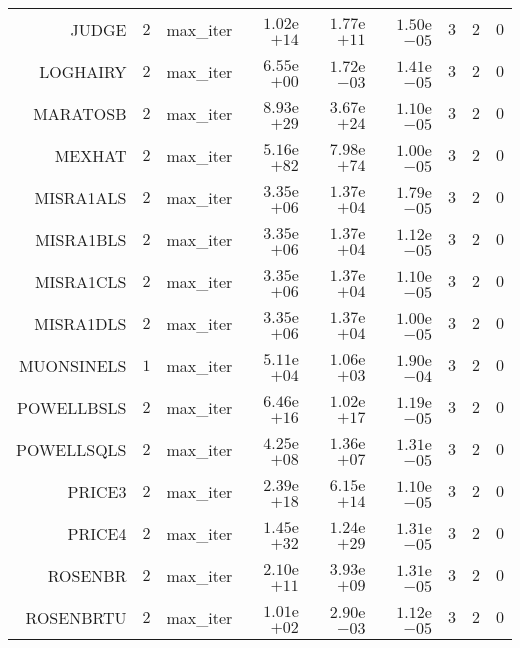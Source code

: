 \begin{longtable}{rrrrrrrrr}
JUDGE & \(     2\) & max\_iter & \( 1.02\)e\(+14\) & \( 1.77\)e\(+11\) & \( 1.50\)e\(-05\) & \(     3\) & \(     2\) & \(     0\) \\
LOGHAIRY & \(     2\) & max\_iter & \( 6.55\)e\(+00\) & \( 1.72\)e\(-03\) & \( 1.41\)e\(-05\) & \(     3\) & \(     2\) & \(     0\) \\
MARATOSB & \(     2\) & max\_iter & \( 8.93\)e\(+29\) & \( 3.67\)e\(+24\) & \( 1.10\)e\(-05\) & \(     3\) & \(     2\) & \(     0\) \\
MEXHAT & \(     2\) & max\_iter & \( 5.16\)e\(+82\) & \( 7.98\)e\(+74\) & \( 1.00\)e\(-05\) & \(     3\) & \(     2\) & \(     0\) \\
MISRA1ALS & \(     2\) & max\_iter & \( 3.35\)e\(+06\) & \( 1.37\)e\(+04\) & \( 1.79\)e\(-05\) & \(     3\) & \(     2\) & \(     0\) \\
MISRA1BLS & \(     2\) & max\_iter & \( 3.35\)e\(+06\) & \( 1.37\)e\(+04\) & \( 1.12\)e\(-05\) & \(     3\) & \(     2\) & \(     0\) \\
MISRA1CLS & \(     2\) & max\_iter & \( 3.35\)e\(+06\) & \( 1.37\)e\(+04\) & \( 1.10\)e\(-05\) & \(     3\) & \(     2\) & \(     0\) \\
MISRA1DLS & \(     2\) & max\_iter & \( 3.35\)e\(+06\) & \( 1.37\)e\(+04\) & \( 1.00\)e\(-05\) & \(     3\) & \(     2\) & \(     0\) \\
MUONSINELS & \(     1\) & max\_iter & \( 5.11\)e\(+04\) & \( 1.06\)e\(+03\) & \( 1.90\)e\(-04\) & \(     3\) & \(     2\) & \(     0\) \\
POWELLBSLS & \(     2\) & max\_iter & \( 6.46\)e\(+16\) & \( 1.02\)e\(+17\) & \( 1.19\)e\(-05\) & \(     3\) & \(     2\) & \(     0\) \\
POWELLSQLS & \(     2\) & max\_iter & \( 4.25\)e\(+08\) & \( 1.36\)e\(+07\) & \( 1.31\)e\(-05\) & \(     3\) & \(     2\) & \(     0\) \\
PRICE3 & \(     2\) & max\_iter & \( 2.39\)e\(+18\) & \( 6.15\)e\(+14\) & \( 1.10\)e\(-05\) & \(     3\) & \(     2\) & \(     0\) \\
PRICE4 & \(     2\) & max\_iter & \( 1.45\)e\(+32\) & \( 1.24\)e\(+29\) & \( 1.31\)e\(-05\) & \(     3\) & \(     2\) & \(     0\) \\
ROSENBR & \(     2\) & max\_iter & \( 2.10\)e\(+11\) & \( 3.93\)e\(+09\) & \( 1.31\)e\(-05\) & \(     3\) & \(     2\) & \(     0\) \\
ROSENBRTU & \(     2\) & max\_iter & \( 1.01\)e\(+02\) & \( 2.90\)e\(-03\) & \( 1.12\)e\(-05\) & \(     3\) & \(     2\) & \(     0\) \\

\end{longtable}
